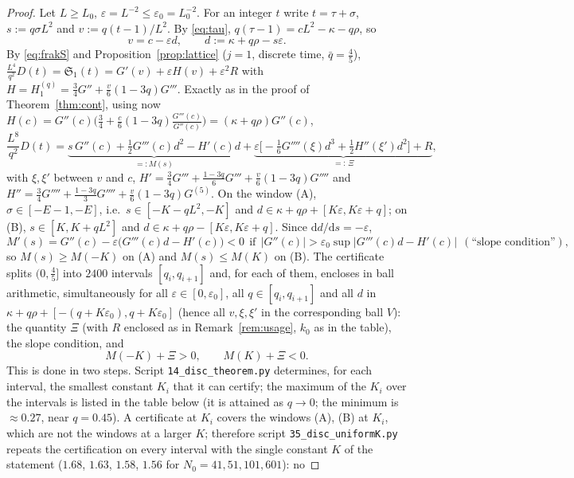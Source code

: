 \documentclass[11pt,a4paper]{article}
\theoremstyle{definition}
\theoremstyle{remark}
\newcommand{\dd}{\mathrm{d}}
\begin{document}
\begin{proof}
Let $L\ge L_0$, $\varepsilon=L^{-2}\le\varepsilon_0=L_0^{-2}$. For an integer $t$ write $t=\tau+\sigma$,
$s:=q\sigma L^2$ and $v:=q(t-1)/L^2$. By \eqref{eq:tau}, $q(\tau-1)=cL^2-\kappa-q\rho$, so
\[
   v=c-\varepsilon d,\qquad d:=\kappa+q\rho-s\varepsilon .
\]
By \eqref{eq:frakS} and Proposition~\ref{prop:lattice} ($j=1$, discrete time, $\bar q=\frac45$),
$\frac{L^4}{q^2}D(t)=\mathfrak S_1(t)=G'(v)+\varepsilon H(v)+\varepsilon^2R$ with
$H=H_1^{(q)}=\frac34G''+\frac v6(1-3q)G'''$. Exactly as in the proof of Theorem~\ref{thm:cont},
using now $H(c)=G''(c)\bigl(\frac34+\frac c6(1-3q)\frac{G'''(c)}{G''(c)}\bigr)=(\kappa+q\rho)G''(c)$,
\begin{equation}\label{eq:discGamma}
  \frac{L^8}{q^2}D(t)=\underbrace{s\,G''(c)+\tfrac12G'''(c)d^2-H'(c)d}_{=:M(s)}
     +\underbrace{\varepsilon\bigl[-\tfrac16G''''(\xi)d^3+\tfrac12H''(\xi')d^2\bigr]+R}_{=:\,\Xi},
\end{equation}
with $\xi,\xi'$ between $v$ and $c$,
$H'=\frac34G'''+\frac{1-3q}6G'''+\frac v6(1-3q)G''''$ and
$H''=\frac34G''''+\frac{1-3q}3G''''+\frac v6(1-3q)G^{(5)}$.
On the window (A), $\sigma\in[-E-1,-E]$, i.e.\ $s\in[-K-qL^2,-K]$ and $d\in\kappa+q\rho+[K\varepsilon,K\varepsilon+q]$; on
(B), $s\in[K,K+qL^2]$ and $d\in\kappa+q\rho-[K\varepsilon,K\varepsilon+q]$. Since $\dd d/\dd s=-\varepsilon$,
\[
  M'(s)=G''(c)-\varepsilon\bigl(G'''(c)d-H'(c)\bigr)<0\ \ \text{if}\ \ 
  |G''(c)|>\varepsilon_0\sup|G'''(c)d-H'(c)|\ \ (\text{``slope condition''}),
\]
so $M(s)\ge M(-K)$ on (A) and $M(s)\le M(K)$ on (B). The certificate splits $(0,\frac45]$ into
$2400$ intervals $[q_{i},q_{i+1}]$ and, for each of them, encloses in ball arithmetic, simultaneously for all
$\varepsilon\in[0,\varepsilon_0]$, all $q\in[q_i,q_{i+1}]$ and all $d$ in
$\kappa+q\rho+[-(q+K\varepsilon_0),q+K\varepsilon_0]$ (hence all $v,\xi,\xi'$ in the corresponding ball $V$): the
quantity $\Xi$ (with $R$ enclosed as in Remark~\ref{rem:usage}, $k_0$ as in the table), the slope condition, and
\[
  M(-K)+\Xi>0,\qquad M(K)+\Xi<0 .
\]
This is done in two steps. Script \texttt{14\_disc\_theorem.py} determines, for each interval, the smallest constant
$K_i$ that it can certify; the maximum of the $K_i$ over the intervals is listed in the table below (it is attained as
$q\to0$; the minimum is $\approx0.27$, near $q=0.45$). A certificate at $K_i$ covers the windows (A), (B) at $K_i$, which
are not the windows at a larger $K$; therefore script \texttt{35\_disc\_uniformK.py} repeats the certification on every
interval with the single constant $K$ of the statement ($1.68$, $1.63$, $1.58$, $1.56$ for $N_0=41,51,101,601$): no

\end{proof}
\end{document}
